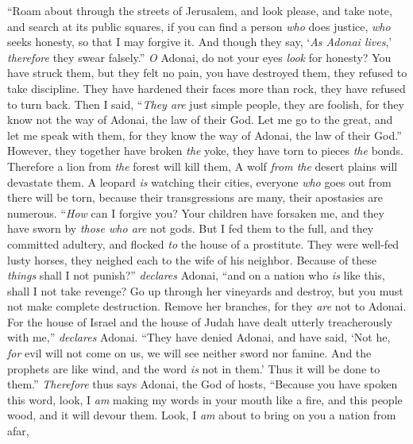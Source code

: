 \begin{biblechapter} %
\verse “Roam about through the streets of Jerusalem, 
and look please, and take note, 
and search at its public squares, 
if you can find a person \textit{who} does justice, 
\textit{who} seeks honesty, 
so that I may forgive it.
\verse And though they say, ‘\textit{As Adonai lives},’ 
\textit{therefore} they swear falsely.”
\verse \textit{O} Adonai, do not your eyes \textit{look} for honesty? 
You have struck them, but they felt no pain, 
you have destroyed them, they refused to take discipline. 
They have hardened their faces more than rock, 
they have refused to turn back.
\verse Then I said, “\textit{They are} just simple people, 
they are foolish, 
for they know not the way of Adonai, 
the law of their God.
\verse Let me go to the great, 
and let me speak with them, 
for they know the way of Adonai, 
the law of their God.” 
However, they together have broken \textit{the} yoke, 
they have torn to pieces \textit{the} bonds.
\verse Therefore a lion from \textit{the} forest will kill them, 
A wolf \textit{from the} desert plains will devastate them. 
A leopard \textit{is} watching their cities, 
everyone \textit{who} goes out from there will be torn, 
because their transgressions are many, 
their apostasies are numerous.
\verse “\textit{How} can I forgive you? 
Your children have forsaken me, 
and they have sworn by \textit{those who are} not gods. 
But I fed them to the full, 
and they committed adultery, 
and flocked \textit{to} the house of a prostitute.
\verse They were well-fed lusty horses, 
they neighed each to the wife of his neighbor.
\verse Because of these \textit{things} shall I not punish?” \textit{declares} Adonai, 
“and on a nation who \textit{is} like this, shall I not take revenge?
\verse Go up through her vineyards and destroy, 
but you must not make complete destruction. 
Remove her branches, 
for they \textit{are} not to Adonai.
\verse For the house of Israel and the house of Judah 
have dealt utterly treacherously with me,” \textit{declares} Adonai.
\verse “They have denied Adonai, and have said, 
‘Not he, \textit{for} evil will not come on us, 
we will see neither sword nor famine.
\verse And the prophets are like wind, 
and the word \textit{is} not in them.’ 
Thus it will be done to them.”
\verse \textit{Therefore} thus says Adonai, the God of hosts, 
“Because you have spoken this word, 
look, I \textit{am} making my words in your mouth like a fire, 
and this people wood, and it will devour them.
\verse Look, I \textit{am} about to bring on you a nation from afar, 

\end{biblechapter}
